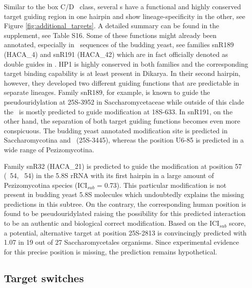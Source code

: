 Similar to the box C/D \sno\ class, several \haca s have a
functional and highly conserved target guiding region in one hairpin
and show lineage-specificity in the other, see Figure
\ref{fig:additional_targets}.  A detailed summary can be found in the
supplement, see Table S16. Some of these functions might already been
annotated, especially in \sno\ sequences of the budding yeast, see
families snR189 (HACA\_4) and snR191 (HACA\_42) which are in fact
officially denoted as double guides in \sce.  HP1 is highly conserved
in both families and the corresponding target binding capability is at
least present in Dikarya. In their second hairpin, however, they
developed two different guiding functions that are predictable in
separate lineages. Family snR189, for example, is known to guide the
pseudouridylation at 25S-3952 in Saccharomycetaceae while outside of
this clade the \sno\ is mostly predicted to guide modification at
18S-633. In snR191, on the other hand, the separation of both target
guiding functions becomes even more conspicuous. The budding yeast
annotated modification site is predicted in Saccharomycotina and \Tde\
(25S-3445), whereas the position U6-85 is predicted in a wide range of
Pezizomycotina.

Family snR32 (HACA\_21) is predicted to guide the modification at
position 57 (\ncr\ 54, \sce\ 54) in the 5.8S rRNA with its first
hairpin in a large amount of Pezizomycotina species (ICI$_{sub}$ =
0.73). This particular modification is not present in budding yeast
5.8S molecules which undoubtedly explains the missing predictions in
this subtree. On the contrary, the corresponding human position is
found to be pseudouridylated raising the possibility for this
predicted interaction to be an authentic and biological correct
modification.  Based on the ICI$_{sub}$ score, a potential,
alternative target at position 25S-2813 is convincingly predicted with
1.07 in 19 out of 27 Saccharomycetales organisms. Since experimental
evidence for this precise position is missing, the prediction remains
hypothetical.

\subsection{Target switches}

